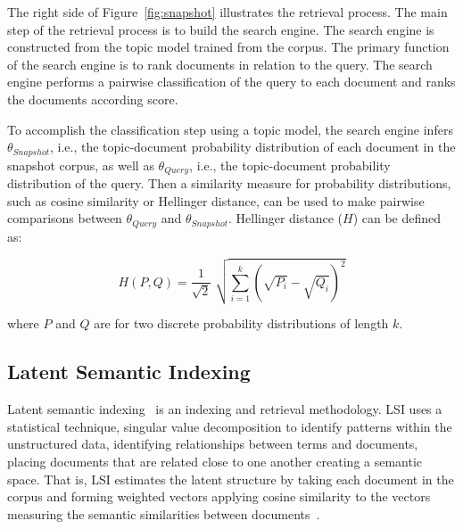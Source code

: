 The right side of Figure~\ref{fig:snapshot} illustrates the retrieval process.
The main step of the retrieval process is to build the search engine.  The
search engine is constructed from the topic model trained from the corpus.  The
primary function of the search engine is to rank documents in relation to the
query.  The search engine performs a pairwise classification of the query to
each document and ranks the documents according score.

To accomplish the classification step using a topic model, the search engine
infers $\theta_{Snapshot}$, i.e., the topic-document probability distribution
of each document in the snapshot corpus, as well as $\theta_{Query}$, i.e., the
topic-document probability distribution  of the query.  Then a similarity
measure for probability distributions, such as cosine similarity or Hellinger
distance, can be used to make pairwise comparisons between $\theta_{Query}$ and
$\theta_{Snapshot}$.  Hellinger distance ($H$) can be defined as:

\begin{equation}
    H(P, Q) = \frac{1}{\sqrt{2}} \; \sqrt{\sum_{i=1}^{k} (\sqrt{P_i} - \sqrt{Q_i})^2}
\end{equation}

where $P$ and $Q$ are for two discrete probability distributions of length $k$.

\subsection{Latent Semantic Indexing}

Latent semantic indexing~\cite{Deerwester-etal:1990} is an indexing and
retrieval methodology. LSI uses a statistical technique, singular value
decomposition to identify patterns within the unstructured data, identifying
relationships between terms and documents, placing documents that are related
close to one another creating a semantic space. That is, LSI estimates the
latent structure by taking each document in the corpus and forming weighted
vectors applying cosine similarity to the vectors measuring the semantic
similarities between documents~\cite{Binkley-Lawrie:2010}.

